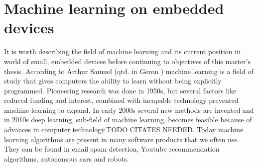 \section{ Machine learning on embedded devices}

It is worth describing the field of machine learning and its current position in world of small, embedded devices before continuing to objectives of this master's thesis.
According to Arthur Samuel (qtd. in Geron \cite{geron}) machine learning is a field of study that gives computers the ability to learn without being explicitly programmed.\cite{tinyml}
Pioneering research was done in 1950s, but several factors like reduced funding and interest, combined with incapable technology prevented machine learning to expand.
In early 2000s several new methods are invented and in 2010s deep learning, sub-field of machine learning, becomes feasible because of advances in computer technology.TODO CITATES NEEDED.
Today machine learning algorithms are present in many software products that we often use. 
They can be found in email spam detection, Youtube recommendation algorithms, autonomous cars and robots.

